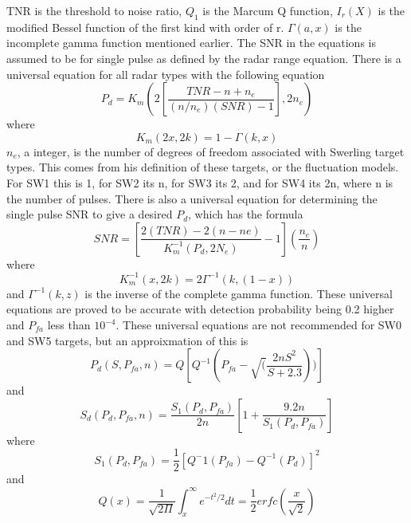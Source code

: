 \documentclass[12pt]{article}
\begin{document}
TNR is the threshold to noise ratio, $Q_1$ is the Marcum Q function, $I_r(X)$ is the modified Bessel function of the first kind with order of r. $\Gamma(a,x)$ is the incomplete gamma function mentioned earlier. The SNR in the equations is assumed to be for single pulse as defined by the radar range equation. There is a universal equation for all radar types with the following equation
\begin{equation}
    P_d = K_m\left( 2 \left[ \frac{TNR-n+n_e}{(n/n_e)(SNR)-1} \right], 2n_e \right)
\end{equation}
where
\begin{equation}
    K_m (2x, 2k) = 1-\Gamma(k, x)
\end{equation}
$n_e$, a integer, is the number of degrees of freedom associated with Swerling target types. This comes from his definition of these targets, or the fluctuation models. For SW1 this is 1, for SW2 its n, for SW3 its 2, and for SW4 its 2n, where n is the number of pulses. There is also a universal equation for determining the single pulse SNR to give a desired $P_d$, which has the formula
\begin{equation}
    SNR = \left[ \frac{2(TNR)-2(n-ne)}{K_{m}^{-1} (P_d, 2N_e)}-1 \right] \left( \frac{n_e}{n} \right)
\end{equation}
where
\begin{equation}
    K_{m}^{-1}(x,2k)=2\Gamma^{-1}(k,(1-x))
\end{equation}
and $\Gamma^{-1}(k,z)$ is the inverse of the complete gamma function.
These universal equations are proved to be accurate with detection probability being 0.2 higher and $P_{fa}$ less than $10^{-4}$. These universal equations are not recommended for SW0 and SW5 targets, but an approixmation of this is 
\begin{equation}
    P_d (S, P_{fa}, n)=Q \left[ Q^{-1} (P_{fa} - \sqrt(\frac{2nS^2}{S+2.3}))\right] 
\end{equation}
and 
\begin{equation}
    S_d(P_d, P_{fa}, n) = \frac{S_1(P_d, P_{fa})}{2n} \left[ 1+\frac{9.2n}{S_1(P_d, P_{fa})}\right]
\end{equation}
where 
\begin{equation}
    S_1(P_d, P_{fa}) = \frac{1}{2}\left[ Q^-1 (P_{fa}) - Q^{-1} (P_d)\right]^2 
\end{equation}
and 
\begin{equation}
    Q(x)=\frac{1}{\sqrt{2\Pi}} \int_{x}^{\infty} e^{-t^2/2} dt=\frac{1}{2}erfc\left(\frac{x}{\sqrt{2}}\right)
\end{equation}
\end{document}
